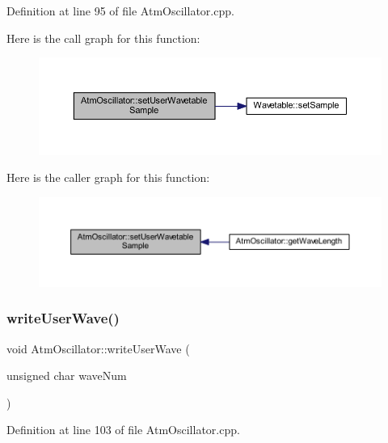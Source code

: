 Definition at line 95 of file Atm\+Oscillator.\+cpp.

Here is the call graph for this function\+:
\nopagebreak
\begin{figure}[H]
\begin{center}
\leavevmode
\includegraphics[width=350pt]{d8/d5f/class_atm_oscillator_aa62dba14693f65adcb3daa7aa4757ba1_cgraph}
\end{center}
\end{figure}
Here is the caller graph for this function\+:
\nopagebreak
\begin{figure}[H]
\begin{center}
\leavevmode
\includegraphics[width=350pt]{d8/d5f/class_atm_oscillator_aa62dba14693f65adcb3daa7aa4757ba1_icgraph}
\end{center}
\end{figure}
\mbox{\label{class_atm_oscillator_a92133ff9c3b34a6acb703f0d6d95cd71}} 
\subsubsection{\texorpdfstring{write\+User\+Wave()}{writeUserWave()}}
{\footnotesize\ttfamily void Atm\+Oscillator\+::write\+User\+Wave (\begin{DoxyParamCaption}\item[{unsigned char}]{wave\+Num }\end{DoxyParamCaption})}



Definition at line 103 of file Atm\+Oscillator.\+cpp.

